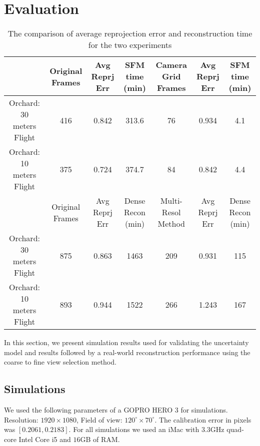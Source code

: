 \section{Evaluation}

\begin{table*}[t]
\caption{The comparison of average reprojection error and reconstruction time for the two experiments}
\centering
\begin{tabular}{|c||c|c|c||c|c|c|}
\hline
 & Original Frames & Avg Reprj Err & SFM time (min) &  Camera Grid Frames & Avg Reprj Err & SFM time (min)\\
\hline
Orchard: 30 meters Flight & 416 & 0.842 & 313.6 & 76 & 0.934 & 4.1\\ 
\hline
Orchard: 10 meters Flight & 375 & 0.724 & 374.7 & 84 & 0.842 & 4.4\\ 
\hline
 & Original Frames & Avg Reprj Err & Dense Recon (min) &  Multi-Resol Method & Avg Reprj Err & Dense Recon (min)\\
\hline
Orchard: 30 meters Flight & 875 & 0.863 & 1463 & 209 & 0.931 & 115\\ 
\hline
Orchard: 10 meters Flight & 893 & 0.944 & 1522 & 266 & 1.243 & 167\\ 
\hline
\end{tabular}
\label{tab:reconT}
\end{table*}

In this section, we present simulation results used for validating the uncertainty model and results followed by a real-world reconstruction performance using the coarse to fine view selection method.

\subsection{Simulations}
We used the following parameters of a GOPRO HERO 3 for simulations.
Resolution: $1920 \times 1080$, Field of view: $120^\circ \times 70^\circ$.
The calibration error in pixels was  $[0.2061, 0.2183]$. 
For all simulations we used an iMac with $3.3$GHz quad-core Intel Core i5 and $16$GB of RAM. 


